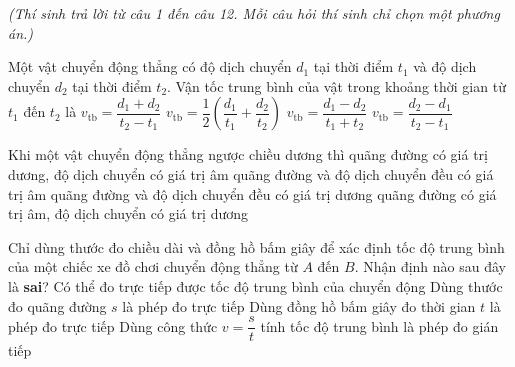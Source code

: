 
\vspace{0.15cm}
\begin{flushleft}
	{\color{blue!50!green}}
	\textit{\small (Thí sinh trả lời từ câu 1 đến câu 12. Mỗi câu hỏi thí sinh chỉ chọn một phương án.)}
\end{flushleft}
\setcounter{ex}{0}
\setcounter{bt}{0}

\begin{ex}
	Một vật chuyển động thẳng có độ dịch chuyển $d_1$ tại thời điểm $t_1$ và độ dịch chuyển $d_2$ tại thời điểm $t_2$. Vận tốc trung bình của vật trong khoảng thời gian từ $t_1$ đến $t_2$ là
	\choice
	{$v_{\text{tb}} = \dfrac{d_1 + d_2}{t_2 - t_1}$}
	{$v_{\text{tb}} = \dfrac{1}{2}\left(\dfrac{d_1}{t_1} + \dfrac{d_2}{t_2}\right)$}
	{$v_{\text{tb}} = \dfrac{d_1 - d_2}{t_1 + t_2}$}
	{\True $v_{\text{tb}} = \dfrac{d_2 - d_1}{t_2 - t_1}$}
\end{ex}

\begin{ex}
	Khi một vật chuyển động thẳng ngược chiều dương thì
	\choice
	{\True quãng đường có giá trị dương, độ dịch chuyển có giá trị âm}
	{quãng đường và độ dịch chuyển đều có giá trị âm}
	{quãng đường và độ dịch chuyển đều có giá trị dương}
	{quãng đường có giá trị âm, độ dịch chuyển có giá trị dương}
\end{ex}

\begin{ex}
	Chỉ dùng thước đo chiều dài và đồng hồ bấm giây để xác định tốc độ trung bình của một chiếc xe đồ chơi chuyển động thẳng từ $A$ đến $B$. Nhận định nào sau đây là \textbf{sai}?
	\choice
	{\True Có thể đo trực tiếp được tốc độ trung bình của chuyển động}
	{Dùng thước đo quãng đường $s$ là phép đo trực tiếp}
	{Dùng đồng hồ bấm giây đo thời gian $t$ là phép đo trực tiếp}
	{Dùng công thức $v = \dfrac{s}{t}$ tính tốc độ trung bình là phép đo gián tiếp}
\end{ex}

